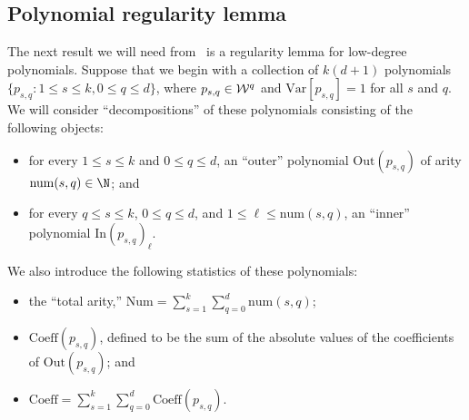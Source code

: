 \documentclass{toc}
\newcommand{\Inner}{\mathrm{In}}
\newcommand{\Outer}{\mathrm{Out}}
\newcommand{\num}{\mathrm{num}}
\newcommand{\Var}{\mathrm{Var}}
\begin{document}
\subsection{Polynomial regularity lemma}

The next result we will need from~\cite{DS14} is a regularity lemma for low-degree polynomials.
Suppose that we begin with a collection of $k(d+1)$ polynomials $\{p_{s,q}: 1 \le s \le k, 0 \le q \le d\}$,
where $p_{s,q} \in {\cal W}^q$ and $\Var[p_{s,q}] = 1$ for all $s$ and $q$. We will consider ``decompositions''
of these polynomials consisting of the following objects:
\begin{itemize}
    \item for every $1 \le s \le k$ and $0 \le q \le d$, an ``outer'' polynomial $\Outer(p_{s,q})$ of arity $\num(s,q) \in \N$; and
    \item for every $q \le s \le k$, $0 \le q \le d$, and $1 \le \ell \le \num(s,q)$, an ``inner'' polynomial $\Inner(p_{s,q})_\ell$.
\end{itemize}
We also introduce the following statistics of these polynomials:
\begin{itemize}
    \item the ``total arity,'' $\mathrm{Num} = \sum_{s=1}^k \sum_{q=0}^d \num(s,q)$;
    \item $\mathrm{Coeff}(p_{s,q})$, defined to be the sum of the absolute values of the coefficients of $\Outer(p_{s,q})$; and
    \item $\mathrm{Coeff} = \sum_{s=1}^k \sum_{q=0}^d \mathrm{Coeff}(p_{s,q})$.
\end{itemize}
\end{document}
